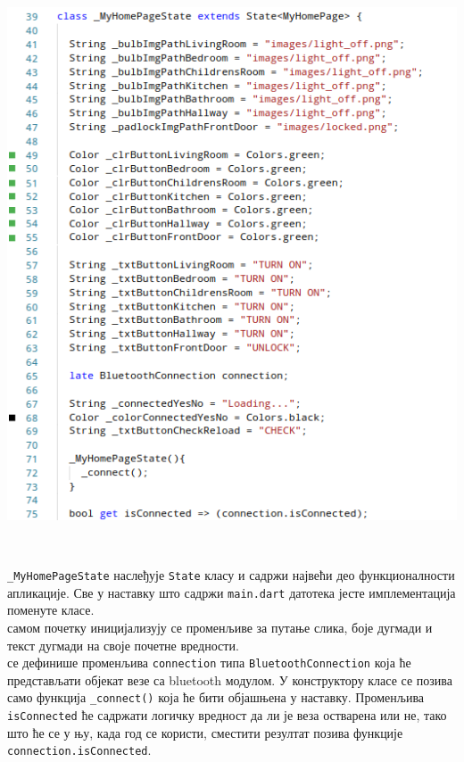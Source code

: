 \documentclass[12pt]{article}
\begin{document}
\vspace{0.3cm}
\begin{center}
    \centering 
    \includegraphics[height=17cm, width=14cm]{images/dart4}
\end{center}
\indent{} \texttt{\_MyHomePageState} наслеђује \texttt{State} класу и садржи највећи део функционалности апликације. Све у наставку што садржи \texttt{main.dart} датотека јесте имплементација поменуте класе.\\
 самом почетку иницијализују се променљиве за путање слика, боје дугмади и текст дугмади на своје почетне вредности.\\
 се дефинише променљива \texttt{connection} типа \texttt{BluetoothConnection} која ће представљати објекат везе са bluetooth модулом. У конструктору класе се позива само функција \texttt{\_connect()} која ће бити објашњена у наставку. Променљива \texttt{isConnected} ће садржати логичку вредност да ли је веза остварена или не, тако што ће се у њу, када год се користи, сместити резултат позива функције \texttt{connection.isConnected}. 
\end{document}
